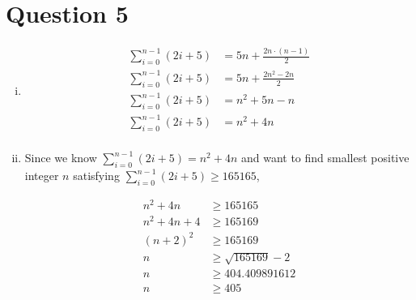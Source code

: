 \documentclass[12pt]{article}
\begin{document}
\section*{Question 5}
    \begin{enumerate}[i)]
        \item
            \begin{align*}
                \sum\limits_{i=0}^{n-1} (2i + 5) &= 5n + \frac{2n \cdot (n - 1)}{2} \\
                \sum\limits_{i=0}^{n-1} (2i + 5) &= 5n + \frac{2n^2 - 2n}{2} \\
                \sum\limits_{i=0}^{n-1} (2i + 5) &= n^2 + 5n - n \\
                \sum\limits_{i=0}^{n-1} (2i + 5) &= n^2 + 4n  \\
            \end{align*}

        \item

        Since we know $\sum\limits_{i=0}^{n-1} (2i + 5) = n^2 + 4n$ and
        want to find smallest positive integer $n$ satisfying
        $\sum\limits_{i=0}^{n-1} (2i + 5) \geq 165165$,

        \begin{align*}
            n^2 + 4n &\geq 165165 \\
            n^2 + 4n + 4 &\geq 165169 \\
            (n + 2)^2 &\geq 165169 \\
            n &\geq \sqrt{165169} - 2 \\
            n &\geq 404.409891612 \\
            n &\geq 405
        \end{align*}
    \end{enumerate}
\end{document}
